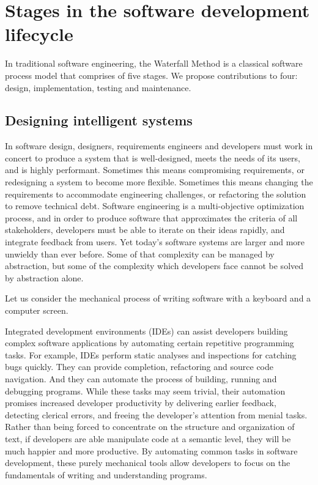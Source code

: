 \documentclass[12pt,initial,twoside,maitrise]{dms}
\numberwithin{equation}{section}
\numberwithin{table}{chapter}
\numberwithin{figure}{chapter}
\begin{document}
\section{Stages in the software development lifecycle}\label{sec:sldc-stages}

In traditional software engineering, the Waterfall Method is a classical software process model that comprises of five stages. We propose contributions to four: design, implementation, testing and maintenance.

\subsection{Designing intelligent systems}

In software design, designers, requirements engineers and developers must work in concert to produce a system that is well-designed, meets the needs of its users, and is highly performant. Sometimes this means compromising requirements, or redesigning a system to become more flexible. Sometimes this means changing the requirements to accommodate engineering challenges, or refactoring the solution to remove technical debt. Software engineering is a multi-objective optimization process, and in order to produce software that approximates the criteria of all stakeholders, developers must be able to iterate on their ideas rapidly, and integrate feedback from users. Yet today's software systems are larger and more unwieldy than ever before. Some of that complexity can be managed by abstraction, but some of the complexity which developers face cannot be solved by abstraction alone.

Let us consider the mechanical process of writing software with a keyboard and a computer screen.

Integrated development environments (IDEs) can assist developers building complex software applications by automating certain repetitive programming tasks. For example, IDEs perform static analyses and inspections for catching bugs quickly. They can provide completion, refactoring and source code navigation. And they can automate the process of building, running and debugging programs. While these tasks may seem trivial, their automation promises increased developer productivity by delivering earlier feedback, detecting clerical errors, and freeing the developer's attention from menial tasks. Rather than being forced to concentrate on the structure and organization of text, if developers are able manipulate code at a semantic level, they will be much happier and more productive. By automating common tasks in software development, these purely mechanical tools allow developers to focus on the fundamentals of writing and understanding programs.
\end{document}
